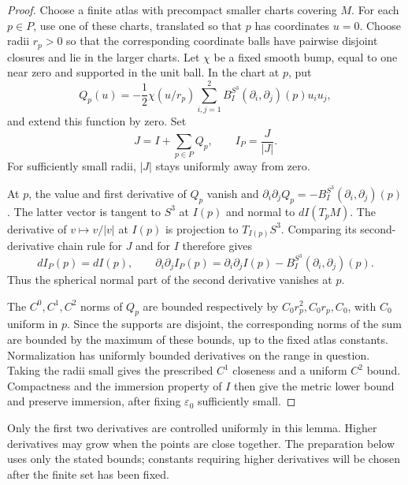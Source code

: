 \begin{proof}
Choose a finite atlas with precompact smaller charts covering $M$.  For each
$p\in P$, use one of these charts, translated so that $p$ has coordinates
$u=0$.  Choose radii $r_p>0$ so that the corresponding coordinate balls have
pairwise disjoint closures and lie in the larger charts.  Let $\chi$ be a
fixed smooth bump, equal to one near zero and supported in the unit ball.
In the chart at $p$, put
\[
 Q_p(u)=-\frac12\chi(u/r_p)
       \sum_{i,j=1}^2 B_I^{S^3}(\partial_i,\partial_j)(p)u_i u_j,
\]
and extend this function by zero.  Set
\[
 J=I+\sum_{p\in P}Q_p,
 \qquad I_P=\frac{J}{|J|}.
\]
For sufficiently small radii, $|J|$ stays uniformly away from zero.

At $p$, the value and first derivative of $Q_p$ vanish and
$\partial_i\partial_jQ_p=-B_I^{S^3}(\partial_i,\partial_j)(p)$.
The latter vector is tangent to $S^3$ at $I(p)$ and normal to $dI(T_pM)$.
The derivative of $v\mapsto v/|v|$ at $I(p)$ is projection to
$T_{I(p)}S^3$.  Comparing its second-derivative chain rule for $J$ and for
$I$ therefore gives
\[
 dI_P(p)=dI(p),\qquad
 \partial_i\partial_j I_P(p)
 =\partial_i\partial_j I(p)
   -B_I^{S^3}(\partial_i,\partial_j)(p).
\]
Thus the spherical normal part of the second derivative vanishes at $p$.

The $C^0,C^1,C^2$ norms of $Q_p$ are bounded respectively by
$C_0r_p^2,C_0r_p,C_0$, with $C_0$ uniform in $p$.  Since the supports are
disjoint, the corresponding norms of the sum are bounded by the maximum of
these bounds, up to the fixed atlas constants.  Normalization has uniformly
bounded derivatives on the range in question.  Taking the radii small gives
the prescribed $C^1$ closeness and a uniform $C^2$ bound.  Compactness and
the immersion property of $I$ then give the metric lower bound and preserve
immersion, after fixing $\varepsilon_0$ sufficiently small.
\end{proof}

Only the first two derivatives are controlled uniformly in this lemma.
Higher derivatives may grow when the points are close together.  The
preparation below uses only the stated bounds; constants requiring higher
derivatives will be chosen after the finite set has been fixed.

